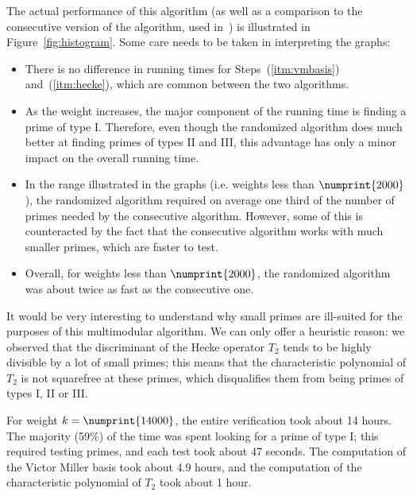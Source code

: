 \documentclass{book}
\begin{document}
The actual performance of this algorithm (as well as a comparison to the
consecutive version of the algorithm, used in~\cite{ConreyFarmer}) is
illustrated in Figure~\ref{fig:histogram}.  Some care needs to be taken in
interpreting the graphs:
\begin{itemize}
  \item There is no difference in running times for Steps~(\ref{itm:vmbasis}) 
    and~(\ref{itm:hecke}), which 
    are common between the two algorithms.
  \item As the weight increases, the major component of the running time is
    finding a prime of type I.  Therefore, even though the randomized
    algorithm does much better at finding primes of types II and III, this
    advantage has only a minor impact on the overall running time.
  \item In the range illustrated in the graphs (i.e. weights less than
    $\numprint{2000}$), the randomized algorithm required on average one third
    of the number of primes needed by the consecutive algorithm.  However,
    some of this is counteracted by the fact that the consecutive algorithm
    works with much smaller primes, which are faster to test.
  \item Overall, for weights less than $\numprint{2000}$, the randomized 
    algorithm was about twice as fast as the consecutive one.  
\end{itemize}

It would be very interesting to understand why small primes are ill-suited for
the purposes of this multimodular algorithm.  We can only offer a heuristic
reason: we observed that the discriminant of the Hecke operator $T_2$ tends to
be highly divisible by a lot of small primes; this means that the
characteristic polynomial of $T_2$ is not squarefree at these primes, which
disqualifies them from being primes of types I, II or III.

For weight $k=\numprint{14000}$, the entire verification took about 14 hours.
The majority (59\%) of the time was spent looking for a prime of type I; this
required testing  primes, and each test took about 47 seconds.
The computation of the Victor Miller basis took about 4.9 hours, and the
computation of the characteristic polynomial of $T_2$ took about 1 hour.
\end{document}
